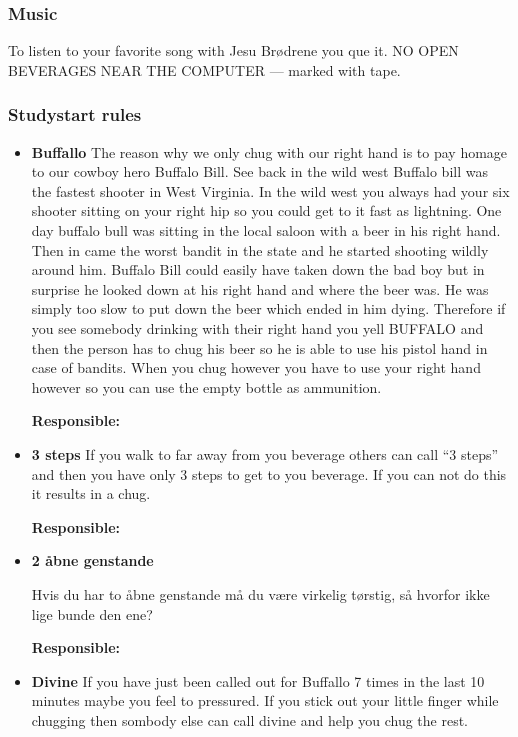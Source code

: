 \documentclass[../../../main.tex]{subfiles}
\begin{document}
\subsubsection{Music}
To listen to your favorite song with Jesu Brødrene you que it. NO OPEN BEVERAGES NEAR THE COMPUTER --- marked with tape.


\subsubsection{Studystart rules}

\begin{itemize}
    \item \textbf{Buffallo}
    The reason why we only chug with our right hand is to pay homage to our cowboy hero Buffalo Bill. See back in the wild west Buffalo bill was the fastest shooter in West Virginia. In the wild west you always had your six shooter sitting on your right hip so you could get to it fast as lightning. One day buffalo bull was sitting in the local saloon with a beer in his right hand. Then in came the worst bandit in the state and he started shooting wildly around him. Buffalo Bill could easily have taken down the bad boy but in surprise he looked down at his right hand and where the beer was. He was simply too slow to put down the beer which ended in him dying. Therefore if you see somebody drinking with their right hand you yell BUFFALO and then the person has to chug his beer so he is able to use his pistol hand in case of bandits. When you chug however you have to use your right hand however so you can use the empty bottle as ammunition.
    
    \textbf{Responsible:} \placeholder
    
    \item \textbf{3 steps}
    If you walk to far away from you beverage others can call ``3 steps'' and then you have only 3 steps to get to you beverage. If you can not do this it results in a chug.
    
    \textbf{Responsible:} \placeholder
    \item \textbf{2 åbne genstande} 

    Hvis du har to åbne genstande må du være virkelig tørstig, så hvorfor ikke lige bunde den ene?
    
    \textbf{Responsible:} \placeholder

    \item \textbf{Divine} 
    If you have just been called out for Buffallo 7 times in the last 10 minutes maybe you feel to pressured. If you stick out your little finger while chugging then sombody else can call divine and help you chug the rest.
    

\end{itemize}
\end{document}
